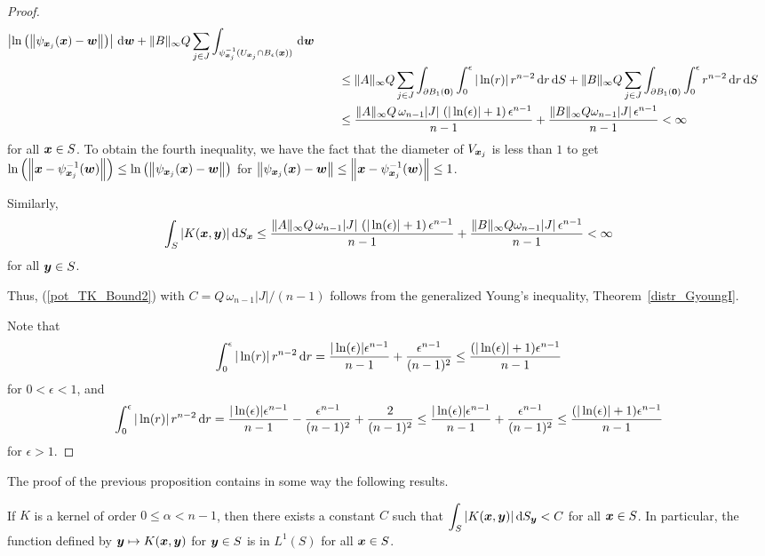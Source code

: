 \begin{proof}
\begin{align*}
\left| \ln\left(
\left\| \psi_{{\bm{x}}_j}({\bm{x}}) - {\bm{w}} \right\|\right) \right|
\,\mathrm{d}{{\bm{w}}}
+ \|B\|_\infty Q \sum_{j\in J}
\int_{\psi_{{\bm{x}}_j}^{-1}(U_{{\bm{x}}_j}\cap B_\epsilon({\bm{x}}))} \,\mathrm{d}{{\bm{w}}} \\
&\qquad \leq \|A\|_\infty Q \sum_{j\in J} \int_{\partial B_1({\bm{0}})}
\int_0^{\epsilon} |\ln(r)| \,r^{n-2} \,\mathrm{d}{r} \,\mathrm{d}{S}
+ \|B\|_\infty Q \sum_{j\in J} \int_{\partial B_1({\bm{0}})}
\int_0^{\epsilon} r^{n-2} \,\mathrm{d}{r} \,\mathrm{d}{S} \\
&\qquad \leq \frac{\|A\|_\infty Q\, \omega_{n-1}
|J|\,\left( |\ln(\epsilon)| + 1 \right) \epsilon^{n-1}}{n-1}
+ \frac{\|B\|_\infty Q \omega_{n-1} |J|\, \epsilon^{n-1}}{n-1}
< \infty
\end{align*}
for all ${\bm{x}} \in S$.  To obtain the fourth inequality, we have
the fact that the diameter of $V_{{\bm{x}}_j}$ is less than $1$ to get
$\displaystyle
\ln\left(\left\| {\bm{x}} - \psi_{{\bm{x}}_j}^{-1}({\bm{w}}) \right\|\right)
\leq \ln\left(\left\| \psi_{{\bm{x}}_j}({\bm{x}}) - {\bm{w}} \right\|\right)$
for
$\displaystyle 
\left\| \psi_{{\bm{x}}_j}({\bm{x}}) - {\bm{w}} \right\|
\leq \left\| {\bm{x}} - \psi_{{\bm{x}}_j}^{-1}({\bm{w}}) \right\| \leq  1$.

Similarly,
\[
\int_S | K({\bm{x}},{\bm{y}}) | \,\mathrm{d}{S}_{{\bm{x}}}
\leq \frac{\|A\|_\infty Q\, \omega_{n-1}
|J|\,\left( |\ln(\epsilon)| + 1 \right) \epsilon^{n-1}}{n-1}
+ \frac{\|B\|_\infty Q \omega_{n-1} |J|\, \epsilon^{n-1}}{n-1}
< \infty
\]
for all ${\bm{y}} \in S$.

Thus, (\ref{pot_TK_Bound2}) with $C= Q\, \omega_{n-1} |J|/(n-1)$
follows from the generalized Young's inequality,
Theorem~\ref{distr_GyoungI}.

Note that
\[
\int_0^{\epsilon} |\ln(r)| \,r^{n-2} \,\mathrm{d}{r} 
= \frac{|\ln(\epsilon)|\epsilon^{n-1}}{n-1} +
\frac{\epsilon^{n-1}}{(n-1)^2}
\leq \frac{(|\ln(\epsilon)| + 1)\epsilon^{n-1}}{n-1}
\]
for $0 < \epsilon < 1$, and
\[
\int_0^{\epsilon} |\ln(r)| \,r^{n-2} \,\mathrm{d}{r} 
= \frac{|\ln(\epsilon)|\epsilon^{n-1}}{n-1} -
\frac{\epsilon^{n-1}}{(n-1)^2} + \frac{2}{(n-1)^2}
\leq \frac{|\ln(\epsilon)|\epsilon^{n-1}}{n-1}
+ \frac{\epsilon^{n-1}}{(n-1)^2}
\leq \frac{(|\ln(\epsilon)| + 1)\epsilon^{n-1}}{n-1}
\]
for $\epsilon >1$.
\end{proof}

The proof of the previous proposition contains in some way the
following results.

\begin{prop} \label{pot_prop_KL1}
If $K$ is a kernel of order $0 \leq \alpha < n-1$, then there exists a
constant $C$ such that
$\displaystyle \int_S |K({\bm{x}},{\bm{y}})| \,\mathrm{d}{S}_{{\bm{y}}} < C$
for all ${\bm{x}} \in S$.  In particular,  the function defined by
${\bm{y}} \mapsto K({\bm{x}},{\bm{y}})$ for ${\bm{y}} \in S$ 
is in $\displaystyle L^1(S)$ for all ${\bm{x}}\in S$.
\end{prop}

